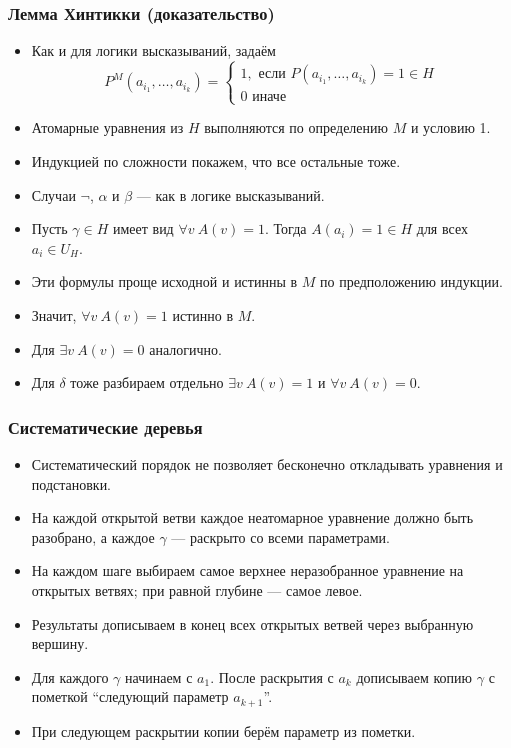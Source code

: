 \documentclass[10pt]{beamer}
\begin{document}
\begin{frame}
\begin{framefont}{\small}
    \frametitle{Лемма Хинтикки (доказательство)}
    \begin{itemize}
        \item Как и для логики высказываний, задаём
        \[ P^M(a_{i_1},\ldots,a_{i_k}) = \left\{ \begin{array}{l}
            1, \text{ если } P(a_{i_1},\ldots,a_{i_k})=1 \in H \\
            0 \text{ иначе} 
        \end{array} \right. \]
        \item Атомарные уравнения из $H$ выполняются по определению $M$ и условию 1.
        \pause
        \item Индукцией по сложности покажем, что все остальные тоже.
        \item Случаи $\neg$, $\alpha$ и $\beta$ --- как в логике высказываний.
        \pause
        \item Пусть $\gamma \in H$ имеет вид $\forall v ~ A(v)=1$. Тогда $A(a_i)=1 \in H$ для всех $a_i\in U_H$.
        \item Эти формулы проще исходной и истинны в $M$ по предположению индукции.
        \item Значит, $\forall v ~ A(v)=1$ истинно в $M$.
        \pause
        \item Для $\exists v ~ A(v)=0$ аналогично.
        \pause
        \item Для $\delta$ тоже разбираем отдельно $\exists v ~ A(v)=1$ и $\forall v ~ A(v)=0$.
    \end{itemize}
\end{framefont}
\end{frame}

\begin{frame}
\begin{framefont}{\small}
    \frametitle{Систематические деревья}
    \begin{itemize}
        \item Систематический порядок не позволяет бесконечно откладывать уравнения и подстановки.
        \item На каждой открытой ветви каждое неатомарное уравнение должно быть разобрано, а каждое $\gamma$ --- раскрыто со всеми параметрами.
        \pause
        \item На каждом шаге выбираем самое верхнее неразобранное уравнение на открытых ветвях; при равной глубине --- самое левое.
        \item Результаты дописываем в конец всех открытых ветвей через выбранную вершину.
        \pause
        \item Для каждого $\gamma$ начинаем с $a_1$. После раскрытия с $a_k$ дописываем копию $\gamma$ с пометкой \enquote{следующий параметр $a_{k+1}$}.
        \item При следующем раскрытии копии берём параметр из пометки.
    \end{itemize}
\end{framefont}
\end{frame}
\end{document}
